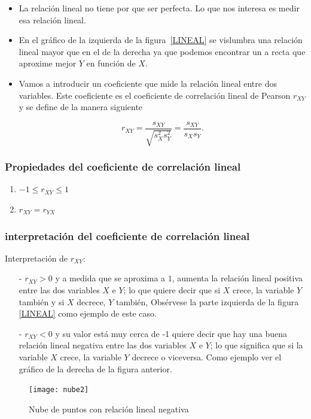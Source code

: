 \begin{frame}
\begin{itemize}
\item La relación lineal no tiene por que ser perfecta. Lo que nos interesa es medir esa
relación lineal.
\item  En el gráfico de la izquierda de la figura~\ref{LINEAL} se vislumbra una
relación lineal mayor que en el de la derecha ya que podemos encontrar un a recta que
aproxime mejor  $Y$ en función de $X$.
\item 
Vamos  a introducir un coeficiente que mide la relación lineal   entre
 dos variables. Este coeficiente es el coeficiente de correlación lineal de Pearson
 $r_{XY}$  y se define de la manera siguiente

$$
r_{XY}=\frac{s_{XY}}{\sqrt{s^2_{X}s^2_{Y}}}=\frac{s_{XY}}{s_{X}s_{Y}}.
$$
\end{itemize}
\end{frame}
%
\begin{frame}
\frametitle{Propiedades del coeficiente de correlación lineal}
\begin{enumerate}[1)]
\item $-1\leq r_{XY}\leq 1$
\item $r_{XY}=r_{YX}$
\end{enumerate}
\end{frame}
\begin{frame}
  \frametitle{interpretación del coeficiente de correlación lineal}
Interpretación de $r_{XY}$:
\begin{itemize}
\item[-] $r_{XY}>0$ y a medida que  se aproxima a  $1$,
aumenta la relación lineal positiva entre las dos variables $X$ e $Y$; lo que quiere
decir que si $X$  crece, la variable $Y$ también y si   $X$ decrece,  $Y$  también,
Obsérvese la parte  izquierda de la figura \ref{LINEAL} como ejemplo de este caso.
 \item[-] $r_{XY}<0$  y su valor está muy cerca de -1 quiere
 decir  que hay una buena relación lineal negativa entre las dos variables $X$
 e $Y$; lo
  que significa que si la variable
  $X$    crece, la variable $Y$ decrece o viceversa. Como ejemplo ver
  el gráfico de la derecha de la figura anterior.
\end{itemize}
\end{frame}

\begin{frame}
\begin{figure}
\begin{center}
\texttt{[image: nube2]}
\end{center} \caption{Nube de puntos con  relación lineal negativa }
\label{LINEALNEGATIVA}
\end{figure}
\end{frame}

